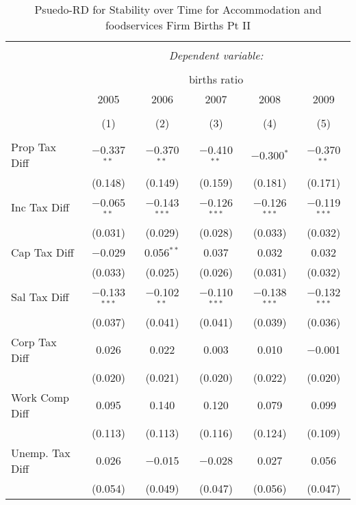 
\begin{table}[!htbp] \centering 
  \caption{Psuedo-RD for Stability over Time for  Accommodation and foodservices Firm Births Pt II} 
  \label{72year} 
\small 
\begin{tabular}{@{\extracolsep{5pt}}lccccc} 
\\[-1.8ex]\hline 
\hline \\[-1.8ex] 
 & \multicolumn{5}{c}{\textit{Dependent variable:}} \\ 
\cline{2-6} 
\\[-1.8ex] & \multicolumn{5}{c}{births ratio} \\ 
 & 2005 & 2006 & 2007 & 2008 & 2009 \\ 
\\[-1.8ex] & (1) & (2) & (3) & (4) & (5)\\ 
\hline \\[-1.8ex] 
 Prop Tax Diff & $-$0.337$^{**}$ & $-$0.370$^{**}$ & $-$0.410$^{**}$ & $-$0.300$^{*}$ & $-$0.370$^{**}$ \\ 
  & (0.148) & (0.149) & (0.159) & (0.181) & (0.171) \\ 
  Inc Tax Diff & $-$0.065$^{**}$ & $-$0.143$^{***}$ & $-$0.126$^{***}$ & $-$0.126$^{***}$ & $-$0.119$^{***}$ \\ 
  & (0.031) & (0.029) & (0.028) & (0.033) & (0.032) \\ 
  Cap Tax Diff & $-$0.029 & 0.056$^{**}$ & 0.037 & 0.032 & 0.032 \\ 
  & (0.033) & (0.025) & (0.026) & (0.031) & (0.032) \\ 
  Sal Tax Diff & $-$0.133$^{***}$ & $-$0.102$^{**}$ & $-$0.110$^{***}$ & $-$0.138$^{***}$ & $-$0.132$^{***}$ \\ 
  & (0.037) & (0.041) & (0.041) & (0.039) & (0.036) \\ 
  Corp Tax Diff & 0.026 & 0.022 & 0.003 & 0.010 & $-$0.001 \\ 
  & (0.020) & (0.021) & (0.020) & (0.022) & (0.020) \\ 
  Work Comp Diff & 0.095 & 0.140 & 0.120 & 0.079 & 0.099 \\ 
  & (0.113) & (0.113) & (0.116) & (0.124) & (0.109) \\ 
  Unemp. Tax Diff & 0.026 & $-$0.015 & $-$0.028 & 0.027 & 0.056 \\ 
  & (0.054) & (0.049) & (0.047) & (0.056) & (0.047) \\ 

\end{tabular}
\end{table}

